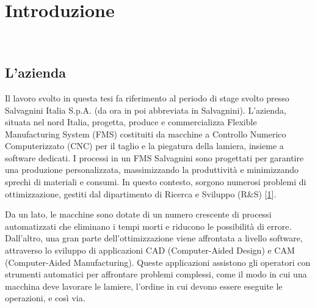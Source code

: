 \chapter{Introduzione}
\label{cap:introduzione}

 \\




\section{L'azienda} \hypertarget{salvagnini}{}

Il lavoro svolto in questa tesi fa riferimento al periodo di stage svolto presso Salvagnini Italia S.p.A. (da ora in poi abbreviata in Salvagnini). L'azienda, situata nel nord Italia, progetta, produce e commercializza Flexible Manufacturing System (FMS) costituiti da macchine a Controllo Numerico Computerizzato (CNC) per il taglio e la piegatura della lamiera, insieme a software dedicati. I processi in un FMS Salvagnini sono progettati per garantire una produzione personalizzata, massimizzando la produttività e minimizzando sprechi di materiali e consumi. In questo contesto, sorgono numerosi problemi di ottimizzazione, gestiti dal dipartimento di Ricerca e Sviluppo (R\&S)  [\hyperlink{bibliografia}{1}].

Da un lato, le macchine sono dotate di un numero crescente di processi automatizzati che eliminano i tempi morti e riducono le possibilità di errore. Dall'altro, una gran parte dell'ottimizzazione viene affrontata a livello software, attraverso lo sviluppo di applicazioni CAD (Computer-Aided Design) e CAM (Computer-Aided Manufacturing). Queste applicazioni assistono gli operatori con strumenti automatici per affrontare problemi complessi, come il modo in cui una macchina deve lavorare le lamiere, l'ordine in cui devono essere eseguite le operazioni, e così via.

